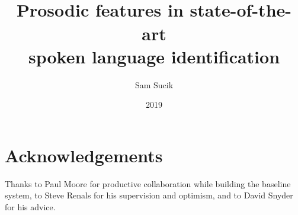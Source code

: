 \documentclass[bsc,frontabs,twoside,singlespacing,parskip,deptreport]{infthesis}
\begin{document}
\title{\vspace{-5.0cm}  \vspace{1cm} \\ Prosodic features in state-of-the-art \\spoken language identification}

\author{Sam Sucik}

\project{\vspace{3cm}{\bf MInf Project (Part 1) Report}}

\date{2019}


\maketitle

\section*{Acknowledgements}{
  Thanks to Paul Moore for productive collaboration while building the baseline system, to Steve Renals for his supervision and optimism, and to David Snyder for his advice.
}

\tableofcontents
\end{document}
